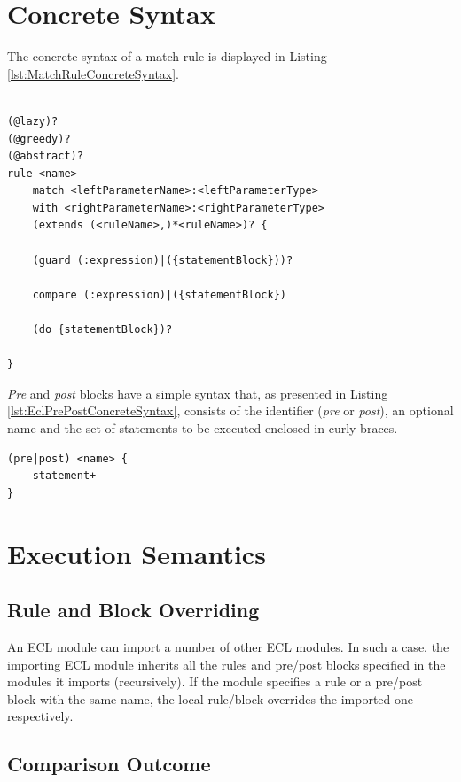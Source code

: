 \section{Concrete Syntax}

The concrete syntax of a match-rule is displayed in Listing \ref{lst:MatchRuleConcreteSyntax}.

\begin{lstlisting}[float=tbp, caption=Concrete Syntax of a MatchRule, label=lst:MatchRuleConcreteSyntax, language=ECL]

(@lazy)?
(@greedy)?
(@abstract)? 
rule <name> 
	match <leftParameterName>:<leftParameterType>
	with <rightParameterName>:<rightParameterType>
	(extends (<ruleName>,)*<ruleName>)? {
	
	(guard (:expression)|({statementBlock}))?
	
	compare (:expression)|({statementBlock})
	
	(do {statementBlock})?
	
}
\end{lstlisting}

\emph{Pre} and \emph{post} blocks have a simple syntax that, as presented in Listing \ref{lst:EclPrePostConcreteSyntax}, consists of the identifier (\emph{pre} or \emph{post}), an optional name and the set of statements to be executed enclosed in curly braces.

\begin{lstlisting}[float=tbp, caption=Concrete Syntax of Pre and Post blocks, label=lst:EclPrePostConcreteSyntax, language=ECL]
(pre|post) <name> {
	statement+
}
\end{lstlisting}

\section{Execution Semantics}

\subsection{Rule and Block Overriding}

An ECL module can import a number of other ECL modules. In such a case, the importing ECL module inherits all the rules and pre/post blocks specified in the modules it imports (recursively). If the module specifies a rule or a pre/post block with the same name, the local rule/block overrides the imported one respectively.

\subsection{Comparison Outcome}

